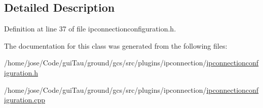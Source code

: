 \subsection{Detailed Description}


Definition at line 37 of file ipconnectionconfiguration.\-h.



The documentation for this class was generated from the following files\-:\begin{DoxyCompactItemize}
\item 
/home/jose/\-Code/gui\-Tau/ground/gcs/src/plugins/ipconnection/\hyperlink{ipconnectionconfiguration_8h}{ipconnectionconfiguration.\-h}\item 
/home/jose/\-Code/gui\-Tau/ground/gcs/src/plugins/ipconnection/\hyperlink{ipconnectionconfiguration_8cpp}{ipconnectionconfiguration.\-cpp}\end{DoxyCompactItemize}
